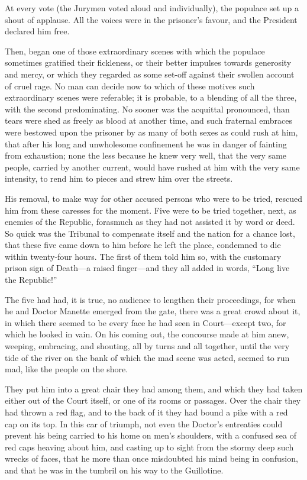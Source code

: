 At every vote (the Jurymen voted aloud and individually), the
populace set up a shout of applause.  All the voices were in the
prisoner's favour, and the President declared him free.

Then, began one of those extraordinary scenes with which the populace
sometimes gratified their fickleness, or their better impulses
towards generosity and mercy, or which they regarded as some set-off
against their swollen account of cruel rage.  No man can decide now
to which of these motives such extraordinary scenes were referable;
it is probable, to a blending of all the three, with the second
predominating.  No sooner was the acquittal pronounced, than tears
were shed as freely as blood at another time, and such fraternal
embraces were bestowed upon the prisoner by as many of both sexes as
could rush at him, that after his long and unwholesome confinement he
was in danger of fainting from exhaustion; none the less because he
knew very well, that the very same people, carried by another current,
would have rushed at him with the very same intensity, to rend him to
pieces and strew him over the streets.

His removal, to make way for other accused persons who were to be
tried, rescued him from these caresses for the moment.  Five were to
be tried together, next, as enemies of the Republic, forasmuch as
they had not assisted it by word or deed.  So quick was the Tribunal
to compensate itself and the nation for a chance lost, that these
five came down to him before he left the place, condemned to die
within twenty-four hours. The first of them told him so, with the
customary prison sign of Death---a raised finger---and they all added
in words, ``Long live the Republic!''

The five had had, it is true, no audience to lengthen their
proceedings, for when he and Doctor Manette emerged from the gate,
there was a great crowd about it, in which there seemed to be every
face he had seen in Court---except two, for which he looked in vain.
On his coming out, the concourse made at him anew, weeping,
embracing, and shouting, all by turns and all together, until the
very tide of the river on the bank of which the mad scene was acted,
seemed to run mad, like the people on the shore.

They put him into a great chair they had among them, and which they
had taken either out of the Court itself, or one of its rooms or
passages.  Over the chair they had thrown a red flag, and to the back
of it they had bound a pike with a red cap on its top.  In this car
of triumph, not even the Doctor's entreaties could prevent his being
carried to his home on men's shoulders, with a confused sea of red
caps heaving about him, and casting up to sight from the stormy deep
such wrecks of faces, that he more than once misdoubted his mind
being in confusion, and that he was in the tumbril on his way to the
Guillotine.

